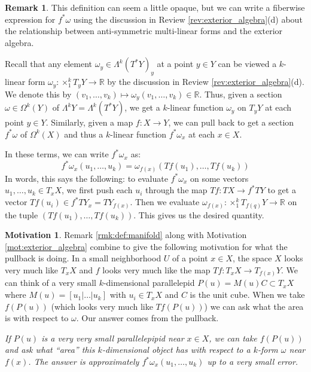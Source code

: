 \documentclass[12pt]{article}
\theoremstyle{definition}
\newtheorem{remark}[theorem]{Remark}
\newtheorem{motivation}[theorem]{Motivation}
\numberwithin{equation}{section}
\newcommand{\R}{{\mathbb R}}
\begin{document}
\begin{remark} \label{rmk:def:form_pullback} This definition can seem a little opaque, but we can write a fiberwise expression for $f^*\omega$ using the discussion in Review \ref{rev:exterior_algebra}(d) about the relationship between anti-symmetric multi-linear forms and the exterior algebra. 

Recall that any element $\omega_y \in \Lambda^k(T^*Y)_y$ at a point $y \in Y$ can be viewed a $k$-linear form $\omega_y:\times_1^k T_yY \to \mathbb{R}$ by the discussion in Review \ref{rev:exterior_algebra}(d). We denote this by $(v_1,\dots,v_k) \mapsto \omega_y(v_1,\dots,v_k) \in \R$. Thus, given a section $\omega \in \Omega^k(Y)$ of $\Lambda^kY = \Lambda^k(T^*Y)$, we get a $k$-linear function $\omega_y$ on $T_yY$ at each point $y \in Y$. Similarly, given a map $f:X \to Y$, we can pull back to get a section $f^*\omega$ of $\Omega^k(X)$ and thus a $k$-linear function $f^*\omega_x$ at each $x \in X$. 

In these terms, we can write $f^*\omega_x$ as:
\[
f^*\omega_x(u_1,\dots,u_k) = \omega_{f(x)}(Tf(u_1),\dots,Tf(u_k))
\]
In words, this says the following: to evaluate $f^*\omega_x$ on some vectors $u_1,\dots,u_k \in T_xX$, we first push each $u_i$ through the map $Tf:TX \to f^*TY$ to get a vector $Tf(u_i) \in f^*TY_x = TY_{f(x)}$. Then we evaluate $\omega_{f(x)}:\times_1^k T_{f(q)}Y \to \R$ on the tuple $(Tf(u_1),\dots,Tf(u_k))$. This gives us the desired quantity. 

\end{remark}

\begin{motivation} Remark \ref{rmk:def:manifold} along with Motivation \ref{mot:exterior_algebra} combine to give the following motivation for what the pullback is doing. In a small neighborhood $U$ of a point $x \in X$, the space $X$ looks very much like $T_xX$ and $f$ looks very much like the map $Tf:T_xX \to T_{f(x)}Y$. We can think of a very small $k$-dimensional parallelepid $P(u) = M(u)C \subset T_xX$ where $M(u) = [u_1|\dots|u_k]$ with $u_i \in T_xX$ and $C$ is the unit cube. When we take $f(P(u))$ (which looks very much like $Tf(P(u))$) we can ask what the area is with respect to $\omega$. Our answer comes from the pullback.
\begin{center}
\emph{If $P(u)$ is a very very small parallelepipid near $x \in X$, we can take $f(P(u))$ and ask what ``area'' this $k$-dimensional object has with respect to a $k$-form $\omega$ near $f(x)$. The answer is approximately $f^*\omega_x(u_1,\dots,u_k)$ up to a very small error.}
\end{center}
\end{motivation}
\end{document}
